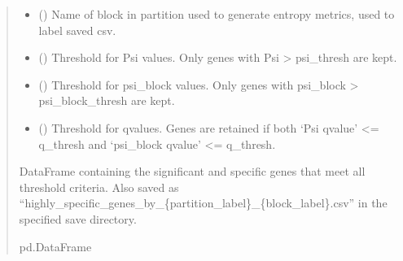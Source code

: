 \documentclass[letterpaper,10pt,english]{sphinxmanual}
\begin{document}
\begin{fulllineitems}
\begin{quote}
\begin{description}
\begin{itemize}
\item {} 
\sphinxAtStartPar
{} () \textendash{} Name of block in partition used to generate entropy metrics, used to label saved csv.

\item {} 
\sphinxAtStartPar
{} (\sphinxstyleliteralemphasis{\sphinxupquote{, }}) \textendash{} Threshold for Psi values. Only genes with Psi \textgreater{} psi\_thresh are kept.

\item {} 
\sphinxAtStartPar
{} (\sphinxstyleliteralemphasis{\sphinxupquote{, }}\sphinxstyleliteralemphasis{\sphinxupquote{, }}) \textendash{} Threshold for psi\_block values. Only genes with psi\_block \textgreater{} psi\_block\_thresh are kept.

\item {} 
\sphinxAtStartPar
{} (\sphinxstyleliteralemphasis{\sphinxupquote{, }}\sphinxstyleliteralemphasis{\sphinxupquote{, }}) \textendash{} Threshold for q\sphinxhyphen{}values. Genes are retained if both
‘Psi q\sphinxhyphen{}value’ \textless{}= q\_thresh and ‘psi\_block q\sphinxhyphen{}value’ \textless{}= q\_thresh.

\end{itemize}

\sphinxAtStartPar
DataFrame containing the significant and specific genes that meet
all threshold criteria. Also saved as
“highly\_specific\_genes\_by\_\{partition\_label\}\_\{block\_label\}.csv”
in the specified save directory.

\sphinxAtStartPar
pd.DataFrame

\end{description}\end{quote}

\end{fulllineitems}
\end{document}
